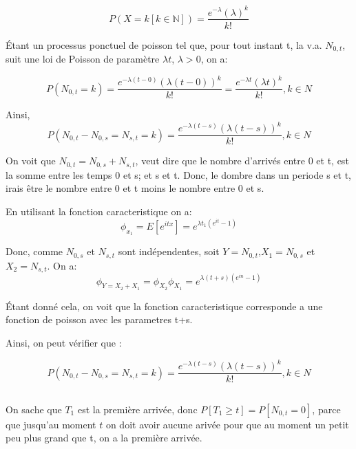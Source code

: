 \documentclass[a4paper]{article}
\begin{document}
\begin{equation}
P(X=k [k \in \mathbb{N}])=\frac{e^{-\lambda }(\lambda )^k}{k!}
\end{equation}

Étant un processus ponctuel de poisson tel que, pour tout instant t, la v.a. $N_{0,t}$,
suit une loi de Poisson de paramètre $\lambda t$, $\lambda >0$, on a:

\begin{equation}
P(N_{0,t}=k)=\frac{e^{-\lambda (t-0)}(\lambda (t-0))^k}{k!}=\frac{e^{-\lambda t}(\lambda t)^k}{k!} , k \in N
\end{equation}

Ainsi,
\begin{equation}
P(N_{0,t}-N_{0,s}=N_{s,t}=k)=\frac{e^{-\lambda (t-s)}(\lambda (t-s))^k}{k!} , k \in N
\end{equation}

On voit que $N_{0,t}=N_{0,s}+N_{s,t}$, veut dire que le nombre d'arrivés entre 0
et t, est  la somme entre les temps 0 et  s; et s et t. Donc,  le dombre dans un
periode s et t, irais être le nombre entre 0 et t moins le nombre entre 0 et s.

En utilisant la fonction caracteristique on a:
\begin{equation}
\phi_{x_1}=E[e^{itx}]=e^{\lambda t_1(e^{it}-1)}
\end{equation}

Donc,    comme     $N_{0,s}$    et    $N_{s,t}$     sont    indépendentes,    soit
$Y=N_{0,t}$,$X_1=N_{0,s}$ et $X_2=N_{s,t}$. On a:
\begin{equation}
\phi_{Y=X_2+X_1}=\phi_{X_2}\phi_{X_1}=e^{\lambda (t+s)(e^{in}-1)}
\end{equation}

Étant donné cela, on voit que la fonction caracteristique corresponde a une 
fonction de poisson avec les parametres t+s.

Ainsi, on peut vérifier que :

\begin{equation}
P(N_{0,t}-N_{0,s}=N_{s,t}=k)=\frac{e^{-\lambda (t-s)}(\lambda (t-s))^k}{k!} , k \in N
\end{equation}


\subsection{}
On sache que $T_1$ est la première arrivée, donc $P[T_1\geq t]=P[N_{0,t}=0]$, parce
que jusqu'au moment $t$ on doit avoir  aucune arivée pour que au moment un petit
peu plus grand que t, on a la première arrivée.
\end{document}
